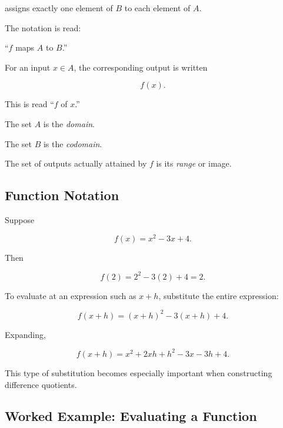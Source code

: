 assigns exactly one element of \(B\) to each element of \(A\).

The notation is read:

``\(f\) maps \(A\) to \(B\).''

For an input \(x\in A\), the corresponding output is written

\[ f(x). \]

This is read ``\(f\) of \(x\).''

The set \(A\) is the \emph{domain}.

The set \(B\) is the \emph{codomain}.

The set of outputs actually attained by \(f\) is its \emph{range} or image.

\subsection{Function Notation}
\label{subsec:analysis-function-notation}

Suppose

\[ f(x)=x^2-3x+4. \]

Then

\[ f(2)=2^2-3(2)+4=2. \]

To evaluate at an expression such as \(x+h\), substitute the entire
expression:

\[
f(x+h)=(x+h)^2-3(x+h)+4.
\]

Expanding,

\[
f(x+h)=x^2+2xh+h^2-3x-3h+4.
\]

This type of substitution becomes especially important when constructing
difference quotients.

\subsection{Worked Example: Evaluating a Function}
\label{subsec:worked-function-evaluation}

